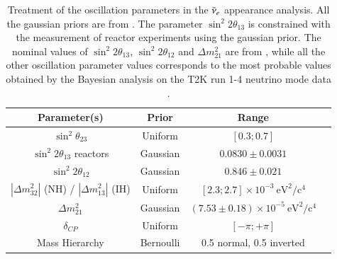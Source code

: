 \begin{table}
	\centering
	\begin{tabular}{| c | c | c | c |}
 	\hline
Parameter(s)													& Prior		& Range     												\\
\hline
$\sin^{2}\theta_{23}$											&  Uniform 	& $[0.3; 0.7]$     							 				\\
$\sin^{2} 2 \theta_{13}$ reactors		&  Gaussian & $0.0830 \pm 0.0031$ 										\\
$\sin^{2} 2 \theta_{12}$  										&  Gaussian & $0.846 \pm 0.021$ 										\\
$|\Delta m^{2}_{32}|$ (NH) / $|\Delta m^{2}_{13}|$ (IH)      	&  Uniform	& $ [2.3; 2.7] \times 10^{-3}~\mbox{eV}^2/\mbox{c}^4$	    \\
$\Delta m^{2}_{21}$      										&  Gaussian & $(7.53 \pm 0.18) \times 10^{-5}~\mbox{eV}^2/\mbox{c}^4$	\\
$\delta_{CP}$                                               	&  Uniform 	& $[-\pi; +\pi]$ 											\\
Mass Hierarchy													&  Bernoulli& 0.5 normal, 0.5 inverted 									\\  
\hline
\end{tabular}
\caption{
Treatment of the oscillation parameters in the $\bar{\nu}_{e}$ appearance analysis. All the gaussian priors are from \cite{pdg_2018}. The parameter $\sin^{2} 2 \theta_{13}$ is constrained with the measurement of reactor experiments using the gaussian prior. The nominal values of $\sin^2 2 \theta_{13}$, $\sin^2 2 \theta_{12}$ and $\Delta m^2_{21}$ are from \cite{pdg_2018}, while all the other oscillation parameter values corresponds to the most probable values obtained by the Bayesian analysis on the T2K run 1-4 neutrino mode data \cite{T2KLongPaper}.
}
\label{tab:osc_param_priors_nuebarapp_Run1-9d}
\end{table}
